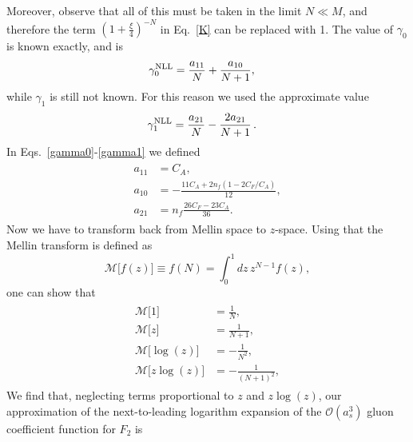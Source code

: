 \documentclass[a4paper]{article}
\newcommand{\ord}[1]{\mathcal{O} (a_s^{#1})}
\begin{document}
Moreover, observe that all of this must be taken in the limit $N \ll M$, and therefore the term $\left(1+\frac{\xi}{4}\right)^{-N}$ in Eq.~\eqref{K} can be replaced with 1.
The value of $\gamma_0$ is known exactly, and is
\begin{align}
	\label{gamma0}
	\gamma^{\rm NLL}_0&=\frac{a_{11}}{N}+\frac{a_{10}}{N+1},
\end{align}
while $\gamma_1$ is still not known. For this reason we used the approximate value
\begin{align}
	\label{gamma1}
	\gamma^{\rm NLL}_1&=\frac{a_{21}}{N}-\frac{2a_{21}}{N+1}\,.
\end{align}
In Eqs.~\eqref{gamma0}-\eqref{gamma1} we defined
\begin{align}
	\begin{split}
	a_{11}&=C_A, \\
	a_{10}&=-\frac{11C_A + 2n_f(1-2C_F/C_A)}{12}, \\
	a_{21}&=n_f\frac{26C_F - 23C_A}{36}.
	\end{split}
\end{align}
Now we have to transform back from Mellin space to $z$-space. Using that the Mellin transform is defined as
\begin{equation}
	\mathcal{M}\bigl[f(z)\bigr]\equiv f(N)=\int_0^1dz\,z^{N-1}f(z),
\end{equation}
one can show that
\begin{align}
	\begin{split}
	\mathcal{M}\bigl[1\bigr]&=\frac{1}{N}, \\
	\mathcal{M}\bigl[z\bigr]&=\frac{1}{N+1}, \\
	\mathcal{M}\bigl[\log(z)\bigr]&=-\frac{1}{N^2}, \\
	\mathcal{M}\bigl[z\log(z)\bigr]&=-\frac{1}{(N+1)^2},
	\end{split}
\end{align}
We find that, neglecting terms proportional to $z$ and $z\log(z)$, our approximation of the next-to-leading logarithm expansion of the $\ord{3}$ gluon coefficient function for $F_2$ is
\begingroup
\allowdisplaybreaks
\end{document}
